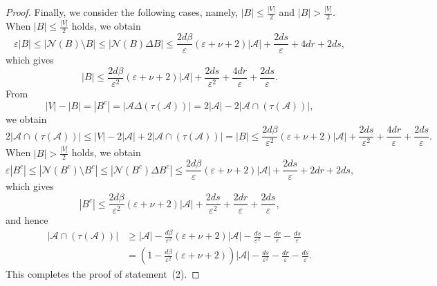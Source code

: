 \documentclass[ALCO,Unicode,published]{cedram}
\newcommand{\calN}{\ensuremath{\mathcal{N}}}
\newcommand{\scrA}{\ensuremath{\mathscr{A}}}
\begin{document}
\begin{proof}
Finally, we consider the following cases, namely, $|B|\leq \frac{|V|}2$ and $|B| > \frac{|V|}2$. When $|B|\leq \frac{|V|}2$ holds, we obtain 
$$
\varepsilon |B| \leq |\calN(B) \setminus B| \leq |\calN(B) \Delta B|  \leq \frac{2d \beta}\varepsilon (\varepsilon + \nu + 2)|\scrA| +  \frac {2ds}\varepsilon  + 4dr +2ds,
$$
which gives 
$$|B| \leq \frac {2d\beta}{ \varepsilon^2} ( \varepsilon + \nu + 2) |\scrA|+  \frac {2ds}{\varepsilon ^2} + \frac{4dr}\varepsilon +\frac{2ds}{\varepsilon}.
$$
From 
$$
|V| - |B| 
 = |B^c| 
  = |\scrA \Delta (\tau (\scrA))| 
 = 2|\scrA| - 2|\scrA\cap (\tau(\scrA))| ,
$$
we obtain 
$$
2|\scrA \cap (\tau(\scrA)) |
\leq |V| - 2|\scrA| + 2|\scrA \cap (\tau(\scrA))|
= |B| 
\leq \frac{2d \beta}{\varepsilon^2} (\varepsilon + \nu + 2)|\scrA|+  \frac {2ds}{\varepsilon^2} + \frac{4dr}\varepsilon +\frac{2ds}{\varepsilon}.
$$
When $|B| > \frac{|V|}2$ holds, we obtain 
$$
\varepsilon |B^c| \leq |\calN(B^c)\setminus B^c| \leq |\calN(B^c)\Delta B^c|  
\leq \frac{2d\beta}{\varepsilon}(\varepsilon + \nu + 2) |\scrA|+  \frac {2ds}\varepsilon + 2dr + 2ds ,
$$
which gives 
$$|B^c| \leq \frac{2d\beta}{\varepsilon^2}(\varepsilon + \nu + 2) |\scrA|+  \frac {2ds}{\varepsilon ^2} +\frac{2dr}{\varepsilon}
+\frac{2ds}{\varepsilon},
$$
and hence 
\begin{align*}
|\scrA \cap (\tau(\scrA)) |
&\geq |\scrA| - \frac {d\beta}{ \varepsilon^2} ( \varepsilon + \nu + 2)|\scrA| -  \frac {ds}{\varepsilon^2} -\frac{dr}{\varepsilon}
-\frac{ds}{\varepsilon}\\
&= \left( 1- \frac {d\beta}{ \varepsilon^2} ( \varepsilon + \nu + 2)\right)|\scrA| - \frac {ds}{\varepsilon^2}
-\frac{dr}{\varepsilon}
-\frac{ds}{\varepsilon} .
\end{align*}
This completes the proof of statement~(2). 
\end{proof}
\end{document}
